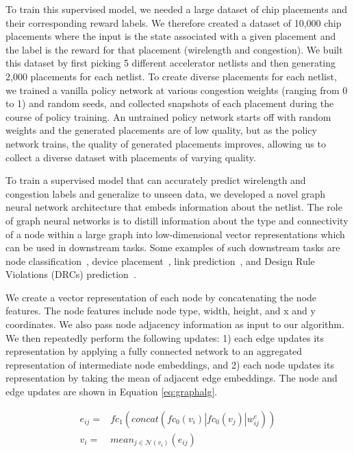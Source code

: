 \documentclass{article}
\begin{document}
To train this supervised model, we needed a large dataset of chip placements and their corresponding reward labels. We therefore created a dataset of 10,000 chip placements where the input is the state associated with a given placement and the label is the reward for that placement (wirelength and congestion). We built this dataset by first picking 5 different accelerator netlists and then generating 2,000 placements for each netlist. To create diverse placements for each netlist, we trained a vanilla policy network at various congestion weights (ranging from 0 to 1) and random seeds, and collected snapshots of each placement during the course of policy training. An untrained policy network starts off with random weights and the generated placements are of low quality, but as the policy network trains, the quality of generated placements improves, allowing us to collect a diverse dataset with placements of varying quality. 

To train a supervised model that can accurately predict wirelength and congestion labels and generalize to unseen data, we developed a novel graph neural network architecture that embeds information about the netlist. The role of graph neural networks is to distill information about the type and connectivity of a node within a large graph into low-dimensional vector representations which can be used in downstream tasks. Some examples of such downstream tasks are node classification~\cite{nazi2019gap}, device placement~\cite{zhou2019gdp}, link prediction~\cite{zhang2018link}, and Design Rule Violations (DRCs) prediction~\cite{RouteNet18}.

 We create a vector representation of each node by concatenating the node features. The node features include node type, width, height, and x and y coordinates. We also pass node adjacency information as input to our algorithm. We then repeatedly perform the following updates: 1) each edge updates its representation by applying a fully connected network to an aggregated representation of intermediate node embeddings, and 2) each node updates its representation by taking the mean of adjacent edge embeddings. The node and edge updates are shown in Equation \ref{eq:graphalg}.
 
\begin{eqnarray}\label{eq:graphalg}
 e_{ij} = & fc_1(concat(fc_0(v_i) | fc_0(v_j) | w^e_{ij})) \\ \nonumber
 v_i = & mean_{j\in \mathcal{N}(v_i)}(e_{ij})
\end{eqnarray}
\end{document}
